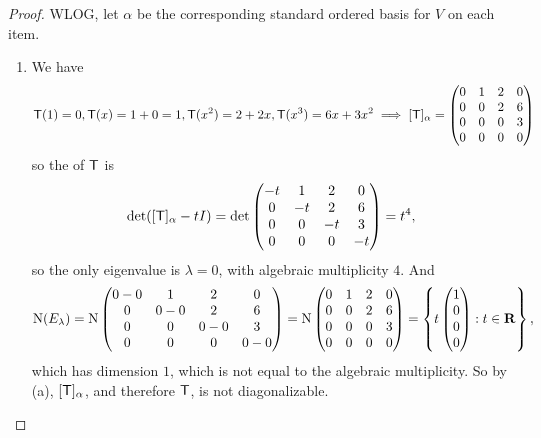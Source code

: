 \begin{proof}
WLOG, let \(\alpha\) be the corresponding standard ordered basis for \(V\) on each item.
\begin{enumerate}
\item We have
\begin{align*}
    \textsf{T}(1) = 0, \textsf{T}(x) = 1 + 0 = 1, \textsf{T}(x^2) = 2 + 2x, \textsf{T}(x^3) = 6x + 3x^2
    \implies [\textsf{T}]_{\alpha}
    = \begin{pmatrix}
        0 & 1 & 2 & 0 \\
        0 & 0 & 2 & 6 \\
        0 & 0 & 0 & 3 \\
        0 & 0 & 0 & 0
    \end{pmatrix}
\end{align*}
so the \CPOLY{} of \(\textsf{T}\) is
\[
    \det([\textsf{T}]_{\alpha} - tI) = \det \begin{pmatrix}
        -t & 1 & 2 & 0 \\
        0 & -t & 2 & 6 \\
        0 & 0 & -t & 3 \\
        0 & 0 & 0 & -t
    \end{pmatrix} = t^4,
\]
so the only eigenvalue is \(\lambda = 0\), with algebraic multiplicity \(4\).
And
\[
    \mathrm{N}(E_{\lambda}) = \mathrm{N} \begin{pmatrix}
        0-0 & 1 & 2 & 0 \\
        0 & 0-0 & 2 & 6 \\
        0 & 0 & 0-0 & 3 \\
        0 & 0 & 0 & 0-0
    \end{pmatrix}
    = \mathrm{N} \begin{pmatrix}
        0 & 1 & 2 & 0 \\
        0 & 0 & 2 & 6 \\
        0 & 0 & 0 & 3 \\
        0 & 0 & 0 & 0
    \end{pmatrix}
    = \left\{ t \begin{pmatrix} 1 \\ 0 \\ 0 \\ 0 \end{pmatrix} : t \in \mathbf{R} \right\},
\]
which has dimension \(1\), which is not equal to the algebraic multiplicity.
So by (a), \([\textsf{T}]_{\alpha}\), and therefore \(\textsf{T}\), is not diagonalizable.


\end{enumerate}
\end{proof}
